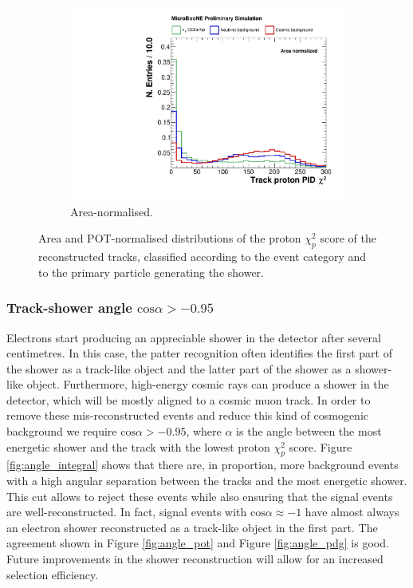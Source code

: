 \begin{figure}[htbp]
\begin{subfigure}{0.49\textwidth}
    \includegraphics[width=\linewidth]{figures/h_track_pidchipr_norm.pdf}
    \caption{Area-normalised.} \label{fig:proton_norm}
  \end{subfigure}
  \caption{Area and POT-normalised distributions of the proton $\chi_{p}^2$ score of the reconstructed tracks, classified according to the event category and to the primary particle generating the shower.}\label{fig:proton_bkg}
\end{figure}

\subsubsection*{Track-shower angle $\mathrm{cos}\alpha > -0.95$}
Electrons start producing an appreciable shower in the detector after several centimetres. In this case, the patter recognition often identifies the first part of the shower as a track-like object and the latter part of the shower as a shower-like object. 
Furthermore, high-energy cosmic rays can produce a shower in the detector, which will be mostly aligned to a cosmic muon track. In order to remove these mis-reconstructed events and reduce this kind of cosmogenic background we require $\mathrm{cos}\alpha > -0.95$, where $\alpha$ is the angle between the most energetic shower and the track with the lowest proton $\chi_{p}^2$ score.
Figure \ref{fig:angle_integral} shows that there are, in proportion, more background events with a high angular separation between the tracks and the most energetic shower. This cut allows to reject these events while also ensuring that the signal events are well-reconstructed. In fact, signal events with $\mathrm{cos}\alpha \approx -1$ have almost always an electron shower reconstructed as a track-like object in the first part. The agreement shown in Figure \ref{fig:angle_pot} and Figure \ref{fig:angle_pdg} is good. Future improvements in the shower reconstruction will allow for an increased selection efficiency.

